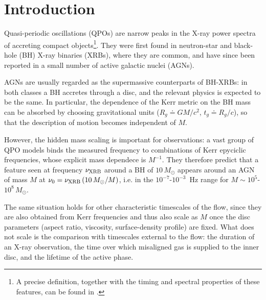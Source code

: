 \section{Introduction}
\label{sec:intro}

Quasi-periodic oscillations (QPOs) are narrow peaks in the X-ray power spectra of accreting compact objects\footnote{A precise definition, together with the timing and spectral properties of these features, can be found in \citet{ingram}.}.
They were first found in neutron-star and black-hole (BH) X-ray binaries (XRBs), where they are common, and have since been reported in a small number of active galactic nuclei (AGNs).

AGNs are usually regarded as the supermassive counterparts of BH-XRBs: in both classes a BH accretes through a disc, and the relevant physics is expected to be the same.
In particular, the dependence of the Kerr metric on the BH mass can be absorbed by choosing gravitational units ($R_g \doteq GM/c^2$, $t_g \doteq R_g/c$), so that the description of motion becomes independent of $M$.

However, the hidden mass scaling is important for observations:
a vast group of QPO models binds the measured frequency to combinations of Kerr epyciclic frequencies, whose explicit mass dependece is $M^{-1}$.
They therefore predict that a feature seen at frequency $\nu_\textup{XRB}$ around a BH of $10\,M_\odot$ appears around an AGN of mass $M$ at $\nu_0=\nu_\textup{XRB}\,(10\,M_\odot/M)$, i.e. in the $10^{-7}$-$10^{-3}$~Hz range for $M\sim10^{5}$-$10^{8}\,M_\odot$.

The same situation holds for other characteristic timescales of the flow, since they are also obtained from Kerr frequencies and thus also scale as $M$ once the disc parameters (aspect ratio, viscosity, surface-density profile) are fixed.
What does not scale is the comparison with timescales external to the flow: the duration of an X-ray observation, the time over which misaligned gas is supplied to the inner disc, and the lifetime of the active phase.

